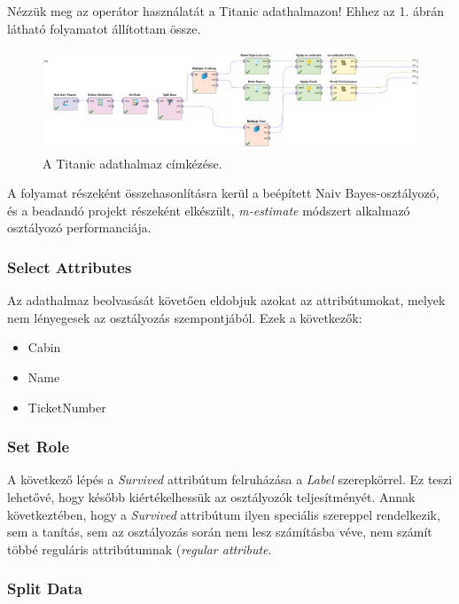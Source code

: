 \documentclass[a4paper]{article}
\begin{document}
Nézzük meg az operátor használatát a Titanic adathalmazon! Ehhez az 1. ábrán látható folyamatot állítottam össze.

\begin{figure}[h]
    \centering
    \includegraphics[width=16cm]{process}
    \caption{A Titanic adathalmaz címkézése.}
\end{figure}

A folyamat részeként összehasonlításra kerül a beépített Naiv Bayes-osztályozó, és a beadandó projekt részeként elkészült, \textit{m-estimate} módszert alkalmazó osztályozó performanciája.

\subsubsection{Select Attributes}

Az adathalmaz beolvasását követően eldobjuk azokat az attribútumokat, melyek nem lényegesek az osztályozás szempontjából. Ezek a következők:

\begin{itemize}
    \item Cabin
    \item Name
    \item TicketNumber
\end{itemize}

\subsubsection{Set Role}

A következő lépés a \textit{Survived} attribútum felruházása a \textit{Label} szerepkörrel. Ez teszi lehetővé, hogy később kiértékelhessük az osztályozók teljesítményét. Annak következtében, hogy a \textit{Survived} attribútum ilyen speciális szereppel rendelkezik, sem a tanítás, sem az osztályozás során nem lesz számításba véve, nem számít többé reguláris attribútumnak (\textit{regular attribute}.

\subsubsection{Split Data}
\end{document}
